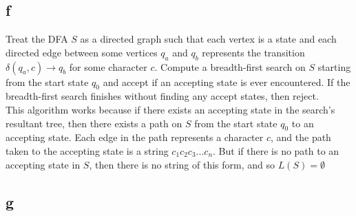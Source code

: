 \documentclass[letterpaper,notitlepage,twoside]{article}
\begin{document}
\subsection*{f}
Treat the DFA $S$ as a directed graph such that each vertex is a state and each directed edge between some vertices $q_a$ and $q_b$ represents the transition $\delta(q_a, c) \rightarrow q_b$ for some character $c$. Compute a breadth-first search on $S$ starting from the start state $q_0$ and accept if an accepting state is ever encountered. If the breadth-first search finishes without finding any accept states, then reject. \\

This algorithm works because if there exists an accepting state in the search's resultant tree, then there exists a path on $S$ from the start state $q_0$ to an accepting state. Each edge in the path represents a character $c$, and the path taken to the accepting state is a string $c_1c_2c_3...c_n$. But if there is no path to an accepting state in $S$, then there is no string of this form, and so $L(S) = \emptyset$
\subsection*{g}
\end{document}
